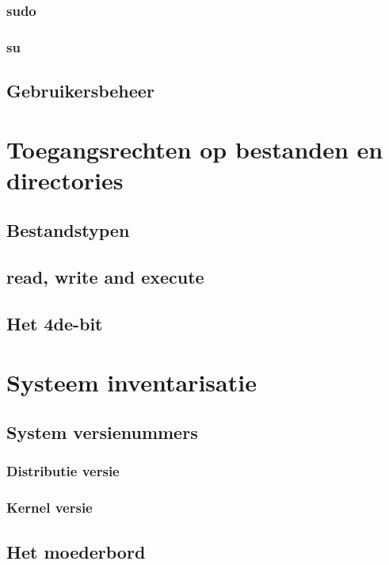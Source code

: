 \documentclass[a4paper,12pt,twoside,openright,titlepage]{book}
\begin{document}
\subsection{sudo}

\subsection{su}

\section{Gebruikersbeheer}





\chapter{Toegangsrechten op bestanden en directories}

\section{Bestandstypen}
\section{read, write and execute}
\section{Het 4de-bit}

\chapter{Systeem inventarisatie}

\section{System versienummers}

\subsection{Distributie versie}

\subsection{Kernel versie}

\section{Het moederbord}
\end{document}
